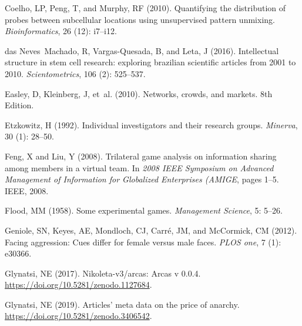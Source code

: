 \documentclass{article}
\theoremstyle{definition}
\begin{document}
\begin{thebibliography}{71}
    Coelho, LP, Peng, T, and Murphy, RF (2010).
    \newblock Quantifying the distribution of probes between subcellular locations
      using unsupervised pattern unmixing.
    \newblock \emph{Bioinformatics}, 26 (12): i7--i12.
    
    das Neves~Machado, R, Vargas-Quesada, B, and Leta, J (2016).
    \newblock Intellectual structure in stem cell research: exploring brazilian
      scientific articles from 2001 to 2010.
    \newblock \emph{Scientometrics}, 106 (2): 525--537.
    
    Easley, D, Kleinberg, J, et~al. (2010).
    \newblock Networks, crowds, and markets.
    \newblock 8th Edition.
    
    Etzkowitz, H (1992).
    \newblock Individual investigators and their research groups.
    \newblock \emph{Minerva}, 30 (1): 28--50.
    
    Feng, X and Liu, Y (2008).
    \newblock Trilateral game analysis on information sharing among members in a
      virtual team.
    \newblock In \emph{2008 IEEE Symposium on Advanced Management of Information
      for Globalized Enterprises (AMIGE}, pages 1--5. IEEE, 2008.
    
    Flood, MM (1958).
    \newblock Some experimental games.
    \newblock \emph{Management Science}, 5: 5--26.
    
    Geniole, SN, Keyes, AE, Mondloch, CJ, Carr{\'e}, JM, and McCormick, CM (2012).
    \newblock Facing aggression: Cues differ for female versus male faces.
    \newblock \emph{PLOS one}, 7 (1): e30366.
    
    Glynatsi, NE (2017).
    \newblock Nikoleta-v3/arcas: Arcas v 0.0.4.
    \newblock \url{https://doi.org/10.5281/zenodo.1127684}.
    
    Glynatsi, NE (2019){}.
    \newblock Articles' meta data on the price of anarchy.
    \newblock \url{https://doi.org/10.5281/zenodo.3406542}.
    

\end{thebibliography}
\end{document}
